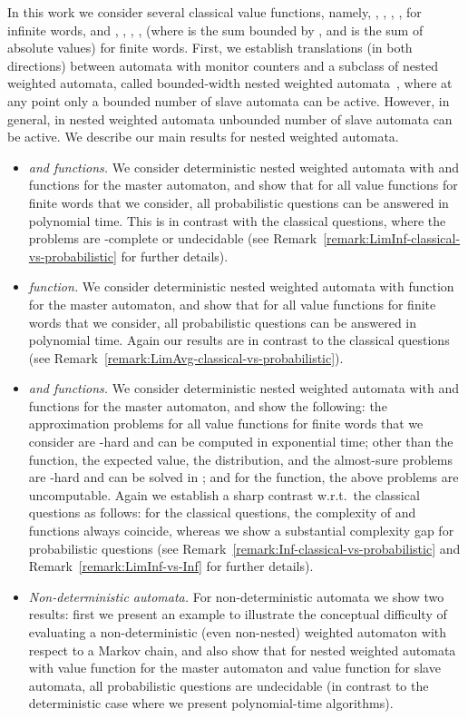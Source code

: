 \documentclass{lmcs}
\begin{document}
\smallskip{}
In this work we consider several classical value functions,
namely, , , , ,  for infinite words,
and , , , ,  (where  is the sum bounded by ,
and  is the sum of absolute values)
for finite words.
First, we establish translations (in both directions) between automata
with monitor counters and a subclass of nested weighted automata, called bounded-width nested weighted automata~\cite{nwa-mfcs},
where at any point only a bounded number of slave automata can be active.
However, in general, in nested weighted automata unbounded number of slave
automata can be active.
We describe our main results for nested weighted automata.
\begin{itemize}
\item {\em  and  functions.}
We consider deterministic nested weighted automata with  and 
functions for the master automaton, and show that for all value functions for
finite words that we consider, all probabilistic questions can be answered
in polynomial time.
This is in contrast with the classical questions, where the problems are
-complete or undecidable (see Remark~\ref{remark:LimInf-classical-vs-probabilistic} for further details).

\item {\em  function.}
We consider deterministic nested weighted automata with 
function for the master automaton, and show that for all value functions
for finite words that we consider, all probabilistic questions can be answered
in polynomial time.
Again our results are in contrast to the classical questions (see Remark~\ref{remark:LimAvg-classical-vs-probabilistic}).


\item {\em  and  functions.}
We consider deterministic nested weighted automata with  and 
functions for the master automaton, and show the following:
the approximation problems for all value functions for finite words that we
consider are -hard and can be computed in exponential time;
other than the  function, the expected value, the distribution, and the
almost-sure problems are -hard and can be solved in ;
and for the  function, the above problems are uncomputable.
Again we establish a sharp contrast w.r.t.\ the classical questions
as follows: for the classical questions, the complexity of  and 
functions always coincide, whereas we show a substantial complexity gap for
probabilistic questions (see Remark~\ref{remark:Inf-classical-vs-probabilistic} and Remark~\ref{remark:LimInf-vs-Inf} for
further details).



\item {\em Non-deterministic automata.}
For non-deterministic automata we show two results: first we present an
example to illustrate the conceptual difficulty of evaluating a non-deterministic
(even non-nested) weighted automaton with respect to a Markov chain, and also show that
for nested weighted automata with  value function for
the master automaton and  value function for slave automata,
all probabilistic questions are undecidable (in contrast to the
deterministic case where we present polynomial-time algorithms).
\end{itemize}
\end{document}
